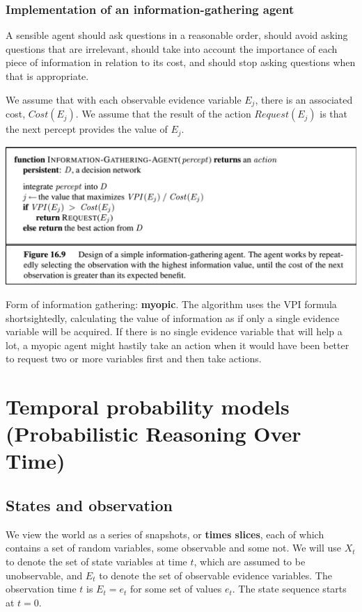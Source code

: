 \documentclass{scrartcl}
\begin{document}
\subsubsection{Implementation of an information-gathering agent}
A sensible agent should ask questions in a reasonable order, should avoid asking questions that are irrelevant, should take into account the importance of each piece of information in relation to its cost, and should stop asking questions when that is appropriate.

We assume that with each observable evidence variable \(E_j\), there is an associated cost, \(Cost(E_j)\). We assume that the result of the action \(Request(E_j)\) is that the next percept provides the value of \(E_j\).

\begin{center}
    \includegraphics[scale=0.4]{img/vpiag.png}
\end{center}

Form of information gathering: \textbf{myopic}. The algorithm uses the VPI formula shortsightedly, calculating the value of information as if only a single evidence variable will be acquired. If there is no single evidence variable that will help a lot, a myopic agent might hastily take an action when it would have been better to request two or more variables first and then take actions.

\section{Temporal probability models (Probabilistic Reasoning Over Time)}
\subsection{States and observation}
We view the world as a series of snapshots, or \textbf{times slices}, each of which contains a set of random variables, some observable and some not. We will use \(X_t\) to denote the set of state variables at time \(t\), which are assumed to be unobservable, and \(E_t\) to denote the set of observable evidence variables. The observation time \(t\) is \(E_t = e_t\) for some set of values \(e_t\). The state sequence starts at \(t=0\).
\end{document}
